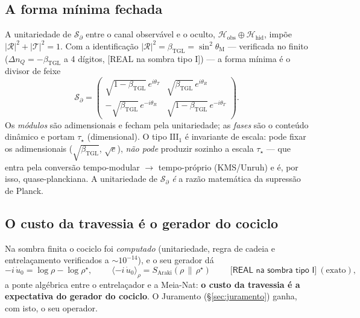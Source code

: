 \documentclass[11pt,a4paper]{article}
\newcommand{\SOMBRA}{\textsf{[REAL na sombra tipo I]}}
\newcommand{\bTGL}{\beta_{\mathrm{TGL}}}
\newcommand{\thM}{\theta_{\mathrm M}}
\newcommand{\Hil}{\mathcal H}
\begin{document}
\subsection{A forma mínima fechada}
A unitariedade de $\mathcal S_\partial$ entre o canal observável e o oculto,
$\Hil_{\mathrm{obs}}\oplus\Hil_{\mathrm{hid}}$, impõe
$|\mathcal R|^2+|\mathcal T|^2=1$. Com a identificação
$|\mathcal R|^2=\bTGL=\sin^2\thM$ --- verificada no finito
($\Delta n_Q=-\bTGL$ a 4 dígitos, \SOMBRA) --- a forma mínima é o divisor de
feixe
\begin{equation}
\mathcal S_\partial=
\begin{pmatrix}
\sqrt{1-\bTGL}\,e^{i\theta_T} & \sqrt{\bTGL}\,e^{i\theta_R}\\[2pt]
-\sqrt{\bTGL}\,e^{-i\theta_R} & \sqrt{1-\bTGL}\,e^{-i\theta_T}
\end{pmatrix}.
\end{equation}
Os \emph{módulos} são adimensionais e fecham pela unitariedade; as
\emph{fases} são o conteúdo dinâmico e portam $\tau_\star$ (dimensional). O
tipo $\mathrm{III}_1$ é invariante de escala: pode fixar os adimensionais
($\sqrt{\bTGL}$, $\sqrt e$), \emph{não pode} produzir sozinho a escala
$\tau_\star$ --- que entra pela conversão tempo-modular $\to$ tempo-próprio
(KMS/Unruh) e é, por isso, quase-planckiana. A unitariedade de
$\mathcal S_\partial$ \emph{é} a razão matemática da supressão de Planck.

\subsection{O custo da travessia é o gerador do cociclo}
Na sombra finita o cociclo foi \emph{computado} (unitariedade, regra de
cadeia e entrelaçamento verificados a $\sim10^{-14}$), e o seu gerador dá
\begin{equation}
-i\,\dot u_0=\log\rho-\log\rho^\star,\qquad
\boxed{\;\langle -i\,\dot u_0\rangle_\rho
=S_{\mathrm{Araki}}(\rho\,\|\,\rho^\star)\;}
\qquad\SOMBRA\ (\text{exato}),
\end{equation}
a ponte algébrica entre o entrelaçador e a Meia-Nat: \textbf{o custo da
travessia é a expectativa do gerador do cociclo}. O Juramento
(\S\ref{sec:juramento}) ganha, com isto, o seu operador.
\end{document}
